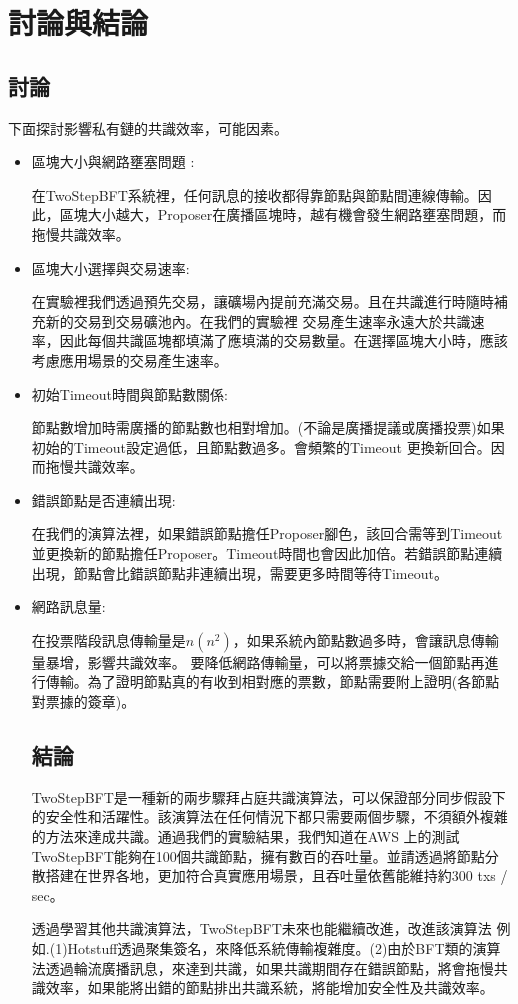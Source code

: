 \chapter{討論與結論}\label{se_8}
\section{討論}\label{se_8} 
下面探討影響私有鏈的共識效率，可能因素。
\begin{itemize}%

\item 區塊大小與網路壅塞問題 :

在TwoStepBFT系統裡，任何訊息的接收都得靠節點與節點間連線傳輸。因此，區塊大小越大，Proposer在廣播區塊時，越有機會發生網路壅塞問題，而拖慢共識效率。


\item 區塊大小選擇與交易速率:

在實驗裡我們透過預先交易，讓礦場內提前充滿交易。且在共識進行時隨時補充新的交易到交易礦池內。在我們的實驗裡 交易產生速率永遠大於共識速率，因此每個共識區塊都填滿了應填滿的交易數量。在選擇區塊大小時，應該考慮應用場景的交易產生速率。

\item 初始Timeout時間與節點數關係:

節點數增加時需廣播的節點數也相對增加。(不論是廣播提議或廣播投票)如果初始的Timeout設定過低，且節點數過多。會頻繁的Timeout
更換新回合。因而拖慢共識效率。


\item 錯誤節點是否連續出現:

在我們的演算法裡，如果錯誤節點擔任Proposer腳色，該回合需等到Timeout並更換新的節點擔任Proposer。Timeout時間也會因此加倍。若錯誤節點連續出現，節點會比錯誤節點非連續出現，需要更多時間等待Timeout。

\item 網路訊息量:

在投票階段訊息傳輸量是$n(n^2)$，如果系統內節點數過多時，會讓訊息傳輸量暴增，影響共識效率。 要降低網路傳輸量，可以將票據交給一個節點再進行傳輸。為了證明節點真的有收到相對應的票數，節點需要附上證明(各節點對票據的簽章)。

\section{結論}\label{se_8}
TwoStepBFT是一種新的兩步驟拜占庭共識演算法，可以保證部分同步假設下的安全性和活躍性。該演算法在任何情況下都只需要兩個步驟，不須額外複雜的方法來達成共識。通過我們的實驗結果，我們知道在AWS 上的測試TwoStepBFT能夠在100個共識節點，擁有數百的吞吐量。並請透過將節點分散搭建在世界各地，更加符合真實應用場景，且吞吐量依舊能維持約300 txs / sec。

透過學習其他共識演算法，TwoStepBFT未來也能繼續改進，改進該演算法 例如.(1)Hotstuff透過聚集簽名，來降低系統傳輸複雜度。(2)由於BFT類的演算法透過輪流廣播訊息，來達到共識，如果共識期間存在錯誤節點，將會拖慢共識效率，如果能將出錯的節點排出共識系統，將能增加安全性及共識效率。

\end{itemize}